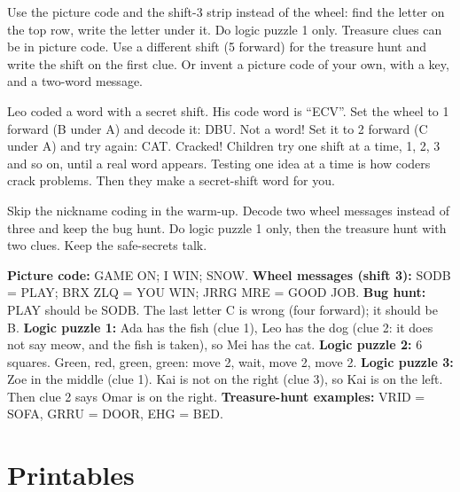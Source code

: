 \begin{differentiation}
\supportpath Use the picture code and the shift-3 strip instead of the wheel: find the letter on the top row, write the letter under it. Do logic puzzle 1 only. Treasure clues can be in picture code.
\extensionpath Use a different shift (5 forward) for the treasure hunt and write the shift on the first clue. Or invent a picture code of your own, with a key, and a two-word message.
\end{differentiation}

\begin{stretchchallenge}
Leo coded a word with a secret shift. His code word is \enquote{ECV}. Set the wheel to 1 forward (B under A) and decode it: DBU. Not a word! Set it to 2 forward (C under A) and try again: CAT. Cracked! Children try one shift at a time, 1, 2, 3 and so on, until a real word appears. Testing one idea at a time is how coders crack problems. Then they make a secret-shift word for you.
\end{stretchchallenge}

\begin{teachernote}
Skip the nickname coding in the warm-up. Decode two wheel messages instead of three and keep the bug hunt. Do logic puzzle 1 only, then the treasure hunt with two clues. Keep the safe-secrets talk.
\end{teachernote}

\begin{teachernote}[Answers]
\textbf{Picture code:} GAME ON; I WIN; SNOW.
\textbf{Wheel messages (shift 3):} SODB = PLAY; BRX ZLQ = YOU WIN; JRRG MRE = GOOD JOB.
\textbf{Bug hunt:} PLAY should be SODB. The last letter C is wrong (four forward); it should be B.
\textbf{Logic puzzle 1:} Ada has the fish (clue 1), Leo has the dog (clue 2: it does not say meow, and the fish is taken), so Mei has the cat.
\textbf{Logic puzzle 2:} 6 squares. Green, red, green, green: move 2, wait, move 2, move 2.
\textbf{Logic puzzle 3:} Zoe in the middle (clue 1). Kai is not on the right (clue 3), so Kai is on the left. Then clue 2 says Omar is on the right.
\textbf{Treasure-hunt examples:} VRID = SOFA, GRRU = DOOR, EHG = BED.
\end{teachernote}

\section{Printables}
